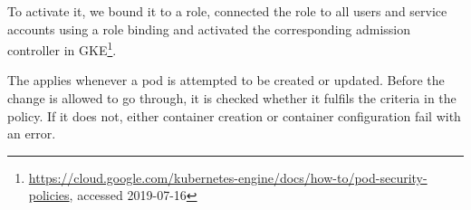 To activate it, we bound it to a role, connected the role to all users and service accounts using a role binding and activated the corresponding admission controller in \ac{GKE}\footnote{\url{https://cloud.google.com/kubernetes-engine/docs/how-to/pod-security-policies}, accessed 2019-07-16}. 

The  applies whenever a pod is attempted to be created or updated. Before the change is allowed to go through, it is checked whether it fulfils the criteria in the policy. If it does not, either container creation or container configuration fail with an error. 

